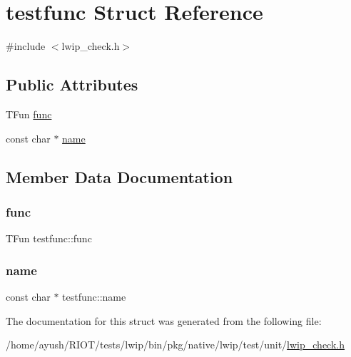 \hypertarget{structtestfunc}{}\section{testfunc Struct Reference}
\label{structtestfunc}


{\ttfamily \#include $<$lwip\+\_\+check.\+h$>$}

\subsection*{Public Attributes}
\begin{DoxyCompactItemize}
\item 
T\+Fun \hyperlink{structtestfunc_a7a2a66ad27be1efad2f7101d69243595}{func}
\item 
const char $\ast$ \hyperlink{structtestfunc_a4c112c9ea1346cf4c4f56ab44aba231f}{name}
\end{DoxyCompactItemize}


\subsection{Member Data Documentation}
\mbox{\label{structtestfunc_a7a2a66ad27be1efad2f7101d69243595}} 
\subsubsection{\texorpdfstring{func}{func}}
{\footnotesize\ttfamily T\+Fun testfunc\+::func}

\mbox{\label{structtestfunc_a4c112c9ea1346cf4c4f56ab44aba231f}} 
\subsubsection{\texorpdfstring{name}{name}}
{\footnotesize\ttfamily const char $\ast$ testfunc\+::name}



The documentation for this struct was generated from the following file\+:\begin{DoxyCompactItemize}
\item 
/home/ayush/\+R\+I\+O\+T/tests/lwip/bin/pkg/native/lwip/test/unit/\hyperlink{native_2lwip_2test_2unit_2lwip__check_8h}{lwip\+\_\+check.\+h}\end{DoxyCompactItemize}
